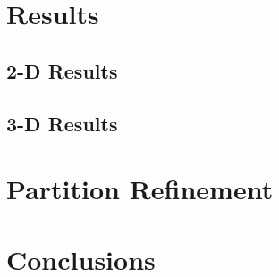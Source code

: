 {  \section{Results}{\label{sec:Spatial Decomposition:Results}
    \subsection{2-D Results}{\label{ssec:Spatial Decomposition:2-D Results}
      \blindtext[8]
    }
    \subsection{3-D Results}{\label{ssec:Spatial Decomposition:3-D Results}
      \blindtext[4]
    }
  }
  \section{Partition Refinement}{\label{sec:Spatial Decomposition:Parition Refinement}
    \blindtext[8]
  }
  \section{Conclusions}{\label{sec:Spatial Decomposition:Conclusions}
    \blindtext[4]
  }
}